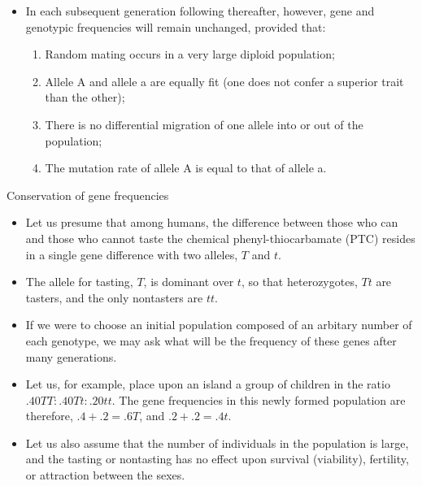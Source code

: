 \documentclass[11pt,dvipsnames,ignorenonframetext,aspectratio=169]{beamer}
\providecommand{\tightlist}{%
  \setlength{\itemsep}{0pt}\setlength{\parskip}{0pt}}
\begin{document}
\begin{frame}{}
\protect\hypertarget{section-3}{}

\begin{itemize}
\tightlist
\item
  In each subsequent generation following thereafter, however, gene and
  genotypic frequencies will remain unchanged, provided that:

  \begin{enumerate}
  \tightlist
  \item
    Random mating occurs in a very large diploid population;
  \item
    Allele A and allele a are equally fit (one does not confer a
    superior trait than the other);
  \item
    There is no differential migration of one allele into or out of the
    population;
  \item
    The mutation rate of allele A is equal to that of allele a.
  \end{enumerate}
\end{itemize}

\end{frame}

\begin{frame}{Conservation of gene frequencies}
\protect\hypertarget{conservation-of-gene-frequencies}{}

\small

\begin{itemize}
\tightlist
\item
  Let us presume that among humans, the difference between those who can
  and those who cannot taste the chemical phenyl-thiocarbamate (PTC)
  resides in a single gene difference with two alleles, \(T\) and \(t\).
\item
  The allele for tasting, \(T\), is dominant over \(t\), so that
  heterozygotes, \(Tt\) are tasters, and the only nontasters are \(tt\).
\item
  If we were to choose an initial population composed of an arbitary
  number of each genotype, we may ask what will be the frequency of
  these genes after many generations.
\item
  Let us, for example, place upon an island a group of children in the
  ratio \(.40TT:.40Tt:.20tt\). The gene frequencies in this newly formed
  population are therefore, \(.4 + .2 = .6 T\), and \(.2 + .2 = .4t\).
\item
  Let us also assume that the number of individuals in the population is
  large, and the tasting or nontasting has no effect upon survival
  (viability), fertility, or attraction between the sexes.
\end{itemize}

\end{frame}
\end{document}
